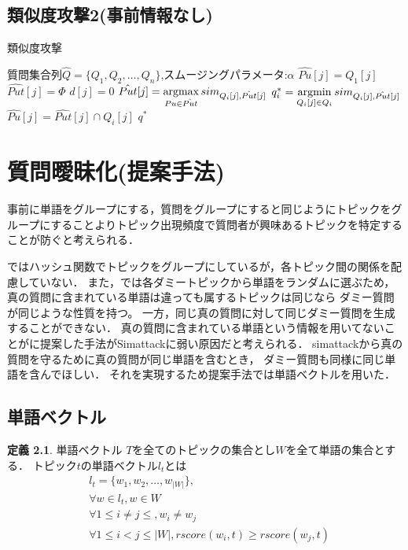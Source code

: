\documentclass[master]{suribt}
\theoremstyle{definition}
\newtheorem{defi}[thm]{定義}
\newcommand{\argmax}{\mathop{\rm argmax}\limits}
\newcommand{\argmin}{\mathop{\rm argmin}\limits}
\begin{document}
 \section{類似度攻撃2(事前情報なし)}

 \begin{algorithm}
 \caption{類似度攻撃}
 \begin{algorithmic}[1]
  \Require 質問集合列$\hat{Q}=\{ Q_1,Q_2, \dots , Q_n\}$,スムージングパラメータ:$\alpha$
   \State $\hat{Pu}[j] = Q_1[j]$
   \State $\hat{Put}[j] = \Phi$
   \State $d[j] = 0$
  \EndFor
   \State $\hat{Put}[j] = \argmax_{Pu \in \hat{Put}}sim_{Q_i[j],\hat{Put}[j]}$
   \EndFor
   \State $q^*_i = \argmin_{Q_i[j] \in Q_i}sim_{Q_i[j],\hat{Put}[j]}$
    \State $\hat{Pu}[j] = \hat{Put}[j] \cap Q_i[j]$
   \EndFor
  \EndFor
  \Ensure $q^*$
 \end{algorithmic}
 \end{algorithm}
 
 \chapter{質問曖昧化(提案手法)}
 事前に単語をグループにする\cite{embellishing2010}，質問をグループにする\cite{providing2009}と同じようにトピックをグループにすることよりトピック出現頻度で質問者が興味あるトピックを特定することが防ぐと考えられる．
 
 \cite{masking2014}ではハッシュ関数でトピックをグループにしているが，各トピック間の関係を配慮していない．
 また，\cite{masking2014}では各ダミートピックから単語をランダムに選ぶため，
 真の質問に含まれている単語は違っても属するトピックは同じなら
 ダミー質問が同じような性質を持つ。
 一方，同じ真の質問に対して同じダミー質問を生成することができない．
 真の質問に含まれている単語という情報を用いてないことが\cite{masking2014}に提案した手法がSimattackに弱い原因だと考えられる．
 simattackから真の質問を守るために真の質問が同じ単語を含むとき，
 ダミー質問も同様に同じ単語を含んでほしい．
 それを実現するため提案手法では単語ベクトルを用いた．
 
 \section{単語ベクトル}
 
 \begin{defi}{単語ベクトル}
  $T$を全てのトピックの集合とし$W$を全て単語の集合とする．
  トピック$t$の単語ベクトル$l_t$とは
  \begin{equation}
  \begin{aligned}
   & l_t  = \{w_1,w_2, \dots , w_{|W|}\}, \\
   & \forall w \in l_t, w \in W \\
   & \forall  1 \leq i \neq j \leq, w_i \neq w_j \\
   & \forall 1 \leq i < j \leq |W|,rscore(w_i,t) \geq rscore(w_j,t) 
  \end{aligned}
  \end{equation}
 \end{defi}
\end{document}

